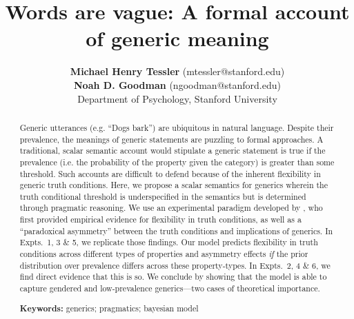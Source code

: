 \documentclass[10pt,letterpaper]{article}
\title{Words are vague: A formal account of generic meaning}
\author{{\large \bf Michael Henry Tessler} (mtessler@stanford.edu)\\ {\large \bf Noah D. Goodman} (ngoodman@stanford.edu) \\
  Department of Psychology, Stanford University}
\begin{document}
\newpage
\tableofcontents
\newpage
\listoffigures
\newpage
\maketitle


\begin{abstract}
Generic utterances (e.g. ``Dogs bark'') are ubiquitous in natural language. Despite their prevalence, the meanings of generic statements are puzzling to formal approaches. A traditional, scalar semantic account would stipulate a generic statement is true if the prevalence (i.e. the probability of the property given the category) is greater than some threshold. Such accounts are difficult to defend because of the inherent flexibility in generic truth conditions. Here, we propose a scalar semantics for generics wherein the truth conditional threshold is underspecified in the semantics but is determined through pragmatic reasoning. 
We use an experimental paradigm developed by , who first provided empirical evidence for flexibility in truth conditions, as well as a ``paradoxical asymmetry'' between the truth conditions and implications of generics. In Expts.~1, 3 \& 5, we replicate those findings. Our model predicts flexibility in truth conditions across different types of properties and asymmetry effects \emph{if} the prior distribution over prevalence differs across these property-types.  In Expts.~2, 4 \& 6, we find direct evidence that this is so. We conclude by showing that the model is able to capture gendered and low-prevalence generics---two cases of theoretical importance.




\textbf{Keywords:} 
generics; pragmatics; bayesian model
\end{abstract}
\end{document}

